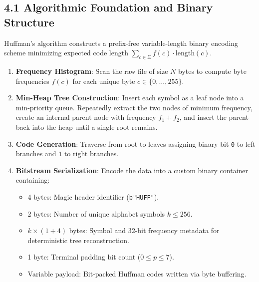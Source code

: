 \documentclass[12pt]{article}
\begin{document}
\subsection*{4.1 Algorithmic Foundation and Binary Structure}
Huffman's algorithm constructs a prefix-free variable-length binary encoding scheme minimizing expected code length $\sum_{c \in \Sigma} f(c) \cdot \text{length}(c)$.
\begin{enumerate}
    \item \textbf{Frequency Histogram}: Scan the raw file of size $N$ bytes to compute byte frequencies $f(c)$ for each unique byte $c \in \{0, \dots, 255\}$.
    \item \textbf{Min-Heap Tree Construction}: Insert each symbol as a leaf node into a min-priority queue. Repeatedly extract the two nodes of minimum frequency, create an internal parent node with frequency $f_1 + f_2$, and insert the parent back into the heap until a single root remains.
    \item \textbf{Code Generation}: Traverse from root to leaves assigning binary bit \texttt{0} to left branches and \texttt{1} to right branches.
    \item \textbf{Bitstream Serialization}: Encode the data into a custom binary container containing:
    \begin{itemize}
        \item 4 bytes: Magic header identifier (\texttt{b"HUFF"}).
        \item 2 bytes: Number of unique alphabet symbols $k \le 256$.
        \item $k \times (1 + 4)$ bytes: Symbol and 32-bit frequency metadata for deterministic tree reconstruction.
        \item 1 byte: Terminal padding bit count ($0 \le p \le 7$).
        \item Variable payload: Bit-packed Huffman codes written via byte buffering.
    \end{itemize}
\end{enumerate}
\end{document}
